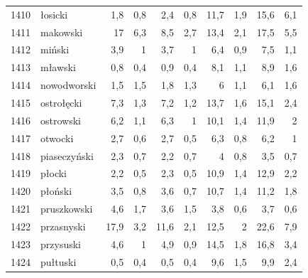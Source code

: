 \begin{center}
\begin{longtable}{lp{3cm}rrrrrrrr}
1410 & łosicki                 & 1,8     & 0,8         & 2,4      & 0,8          & 11,7     & 1,9          & 15,6     & 6,1          \\
1411 & makowski                & 17      & 6,3         & 8,5      & 2,7          & 13,4     & 2,1          & 17,5     & 5,5          \\
1412 & miński                  & 3,9     & 1           & 3,7      & 1            & 6,4      & 0,9          & 7,5      & 1,1          \\
1413 & mławski                 & 0,8     & 0,4         & 0,9      & 0,4          & 8,1      & 1,1          & 8,9      & 1,6          \\
1414 & nowodworski             & 1,5     & 1,5         & 1,8      & 1,3          & 6        & 1,1          & 6,1      & 1,6          \\
1415 & ostrołęcki              & 7,3     & 1,3         & 7,2      & 1,2          & 13,7     & 1,6          & 15,1     & 2,4          \\
1416 & ostrowski               & 6,2     & 1,1         & 6,3      & 1            & 10,1     & 1,4          & 11,9     & 2            \\
1417 & otwocki                 & 2,7     & 0,6         & 2,7      & 0,5          & 6,3      & 0,8          & 6,2      & 1            \\
1418 & piaseczyński            & 2,3     & 0,7         & 2,2      & 0,7          & 4        & 0,8          & 3,5      & 0,7          \\
1419 & płocki                  & 2,2     & 0,5         & 2,3      & 0,5          & 10,9     & 1,4          & 12,9     & 2,2          \\
1420 & płoński                 & 3,5     & 0,8         & 3,6      & 0,7          & 10,7     & 1,4          & 11,2     & 1,8          \\
1421 & pruszkowski             & 4,6     & 1,7         & 3,6      & 1,5          & 3,8      & 0,6          & 3,7      & 0,6          \\
1422 & przasnyski              & 17,9    & 3,2         & 11,6     & 2,1          & 12,5     & 2            & 22,6     & 7,9          \\
1423 & przysuski               & 4,6     & 1           & 4,9      & 0,9          & 14,5     & 1,8          & 16,8     & 3,4          \\
1424 & pułtuski                & 0,5     & 0,4         & 0,5      & 0,4          & 9,6      & 1,5          & 9,9      & 2,4          \\

\end{longtable}
\end{center}
